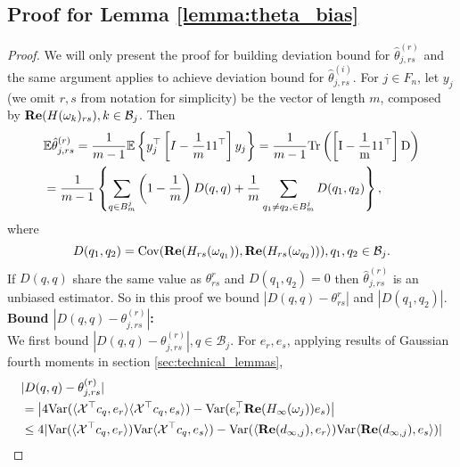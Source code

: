\subsection{Proof for Lemma \ref{lemma:theta_bias}} 
\begin{proof}
We will only present the proof for building deviation bound for  $\hat{\theta}^{(r)}_{j,rs}$ and the same argument applies to achieve deviation bound for  $\hat{\theta}^{(i)}_{j,rs}$.
For $j\in F_n$, let $y_j$(we omit $r,s$ from notation for simplicity) be the vector of length $m$, composed by  ${\bf Re}(H(\omega_k)_{rs}), k\in \mathcal{B}_j$. Then 
\begin{equation}
\begin{aligned}
&\mathbb{E} \hat{\theta}^{(r)}_{j,rs} = \frac{1}{m-1}\mathbb{E}\left\{y_j^\top   \left[I-\frac{1}{m}11^\top   \right]y_j\right\} = \frac{1}{m-1}\rm{Tr}\left(\left[I-\frac{1}{m}11^\top   \right] D\right) \\
&= \frac{1}{m-1}\left\{\sum_{q\in B^j_m} \left(1-\frac{1}{m}\right)D(q,q) + \frac{1}{m} \sum_{q_1\neq q_2, \in B^j_m}D(q_1,q_2)\right\}, 
\end{aligned}
\end{equation}
where 
\begin{equation}
D(q_1,q_2) = \mbox{Cov}({\bf Re}(H_{rs}(\omega_{q_1})), {\bf Re}(H_{rs}(\omega_{q_2}))), q_1,q_2 \in \mathcal{B}_j.
\end{equation}
If $D(q,q)$ share the same value as $\theta^r_{rs}$ and $D(q_1,q_2)=0$ then $\hat{\theta}^{(r)}_{j,rs}$ is an unbiased estimator. So in this proof we bound  
$|D(q,q) - \theta^r_{rs}|$ and $|D(q_1,q_2)|$.\\[0.2cm]
{\bf Bound $|D(q,q) - \theta^{(r)}_{j, rs}|$:}\\
We first bound  $|D(q,q)-\theta^{(r)}_{j, rs}|, q\in \mathcal{B}_j$. 
For $e_r, e_s$, applying results of Gaussian fourth moments in section \ref{sec:technical_lemmas}, 
\begin{equation}
\label{eq: dif_liminting_var}
\begin{aligned}
&|D(q,q)-\theta^{(r)}_{j, rs}| \\
&=  \left|4\var(\langle \mathcal{X}^\top   c_q,e_r\rangle \langle \mathcal{\mathcal{X}}^\top   c_q,e_s\rangle) - \var(e_r^\top  {\bf Re}(H_{\infty}(\omega_j))e_s)\right| \\
&\le 4|\var(\langle \mathcal{\mathcal{X}}^\top   c_q,e_r\rangle)\var{\langle \mathcal{\mathcal{X}}^\top   c_q,e_s\rangle)} - \var(\langle {\bf Re}(d_{\infty, j}),e_r\rangle)\var{\langle {\bf Re}(d_{\infty, j}),e_s\rangle)}| \\

\end{aligned}
\end{equation}
\end{proof}
